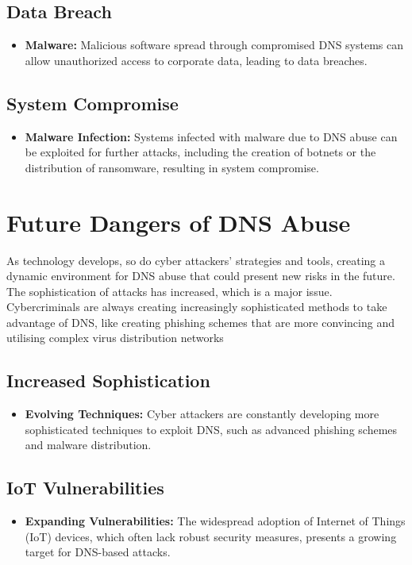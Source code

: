 \subsection{Data Breach}
\begin{itemize}
    \item \textbf{Malware:} Malicious software spread through compromised DNS systems can allow unauthorized access to corporate data, leading to data breaches.\cite{icann2022dnsabusetrends, fowler2016data}
\end{itemize}

\subsection{System Compromise}
\begin{itemize}
    \item \textbf{Malware Infection:} Systems infected with malware due to DNS abuse can be exploited for further attacks, including the creation of botnets or the distribution of ransomware, resulting in system compromise.\cite{dotmagazine2022dnsabuse, saxe2018malware}
\end{itemize}

\section{Future Dangers of DNS Abuse}

As technology develops, so do cyber attackers' strategies and tools, creating a dynamic environment for DNS abuse that could present new risks in the future. The sophistication of attacks has increased, which is a major issue. Cybercriminals are always creating increasingly sophisticated methods to take advantage of DNS, like creating phishing schemes that are more convincing and utilising complex virus distribution networks

\subsection{Increased Sophistication}
\begin{itemize}
    \item \textbf{Evolving Techniques:} Cyber attackers are constantly developing more sophisticated techniques to exploit DNS, such as advanced phishing schemes and malware distribution.\cite{icann2022dnsabusetrends, wrightson2014advanced}
\end{itemize}

\subsection{IoT Vulnerabilities}
\begin{itemize}
    \item \textbf{Expanding Vulnerabilities:} The widespread adoption of Internet of Things (IoT) devices, which often lack robust security measures, presents a growing target for DNS-based attacks.\cite{circleid2020dnstrends, mahmoud2015internet}
\end{itemize}


